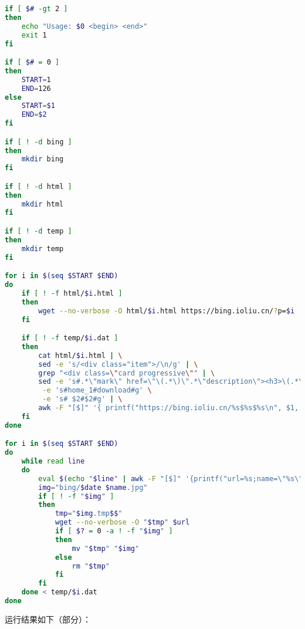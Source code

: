 \documentclass[blue,normal,cn]{elegantnote}
\begin{document}
\begin{lstlisting}[language=bash]
if [ $# -gt 2 ]
then
	echo "Usage: $0 <begin> <end>"
	exit 1
fi

if [ $# = 0 ]
then
	START=1
	END=126
else
	START=$1
	END=$2
fi

if [ ! -d bing ]
then 
	mkdir bing
fi

if [ ! -d html ]
then 
	mkdir html
fi

if [ ! -d temp ]
then 
	mkdir temp
fi

for i in $(seq $START $END)
do
	if [ ! -f html/$i.html ]
	then
		wget --no-verbose -O html/$i.html https://bing.ioliu.cn/?p=$i
	fi

	if [ ! -f temp/$i.dat ]
	then
		cat html/$i.html | \
		sed -e 's/<div class="item">/\n/g' | \
		grep "<div class=\"card progressive\"" | \
		sed -e 's#.*\"mark\" href=\"\(.*\)\".*\"description\"><h3>\(.*\)(©.*\([0-9]\{4\}\-[0-9]\{2\}-[0-9]\{2\}\)<.*#\1$\2$\3#g' \
		 -e 's#home_1#download#g' \
		 -e 's# $2#$2#g' | \
		awk -F "[$]" '{ printf("https://bing.ioliu.cn/%s$%s$%s\n", $1, $2, $3)}' > temp/$i.dat
	fi
done

for i in $(seq $START $END)
do
	while read line
	do
 		eval $(echo "$line" | awk -F "[$]" '{printf("url=%s;name=\"%s\";date=%s",$1,$2,$3)}')
		img="bing/$date $name.jpg"
		if [ ! -f "$img" ]
 		then
			tmp="$img.tmp$$"
			wget --no-verbose -O "$tmp" $url
			if [ $? = 0 -a ! -f "$img" ]
			then
				mv "$tmp" "$img"
			else
				rm "$tmp"
			fi
		fi
	done < temp/$i.dat
done
\end{lstlisting}

运行结果如下（部分）：
\end{document}
